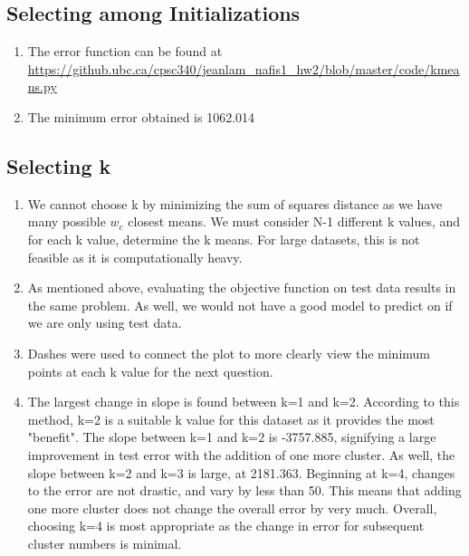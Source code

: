 \documentclass{article}
\begin{document}
\subsection{Selecting among Initializations}
\begin{enumerate}
\item The error function can be found at \url{https://github.ubc.ca/cpsc340/jeanlam_nafis1_hw2/blob/master/code/kmeans.py}
\item {} The minimum error obtained is 1062.014
\end{enumerate}
\subsection{Selecting k}
\begin{enumerate}
\item We cannot choose k by minimizing the sum of squares distance as we have many possible ${w_c}$ closest means. We must consider N-1 different k values, and for each k value, determine the k means. For large datasets, this is not feasible as it is computationally heavy. 
\item As mentioned above, evaluating the objective function on test data results in the same problem. As well, we would not have a good model to predict on if we are only using test data. 
\item {} Dashes were used to connect the plot to more clearly view the minimum points at each k value for the next question. 
\item The largest change in slope is found between k=1 and k=2. According to this method, k=2 is a suitable k value for this dataset as it provides the most "benefit". The slope between k=1 and k=2 is -3757.885, signifying a large improvement in test error with the addition of one more cluster. As well, the slope between k=2 and k=3 is large, at 2181.363. Beginning at k=4, changes to the error are not drastic, and vary by less than 50. This means that adding one more cluster does not change the overall error by very much. Overall, choosing k=4 is most appropriate as the change in error for subsequent cluster numbers is minimal. 
\end{enumerate}
\end{document}
